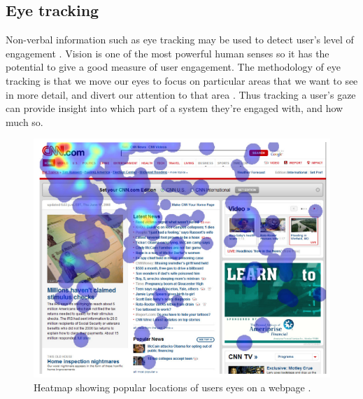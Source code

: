 \documentclass{article}
\begin{document}


\subsection{Eye tracking}

Non-verbal information such as eye tracking may be used to detect user’s level of engagement \cite{lala2017detection}.
Vision is one of the most powerful human senses so it has the potential to give a good measure of user engagement. 
The methodology of eye tracking is that we move our eyes to focus on particular areas that we want to see in more detail, and divert our attention to that area \cite{duchowski2007eye}. 
Thus tracking a user’s gaze can provide insight into which part of a system they’re engaged with, and how much so.

\begin{figure}[ht!]
    \centering
    \centerline{
        \includegraphics[scale=0.85]{EyeHeatmap.PNG}
    }
    \caption{Heatmap showing popular locations of users eyes on a webpage \cite{buscher2009you}.}
    \label{fig:eyetrack}
\end{figure}
\end{document}
